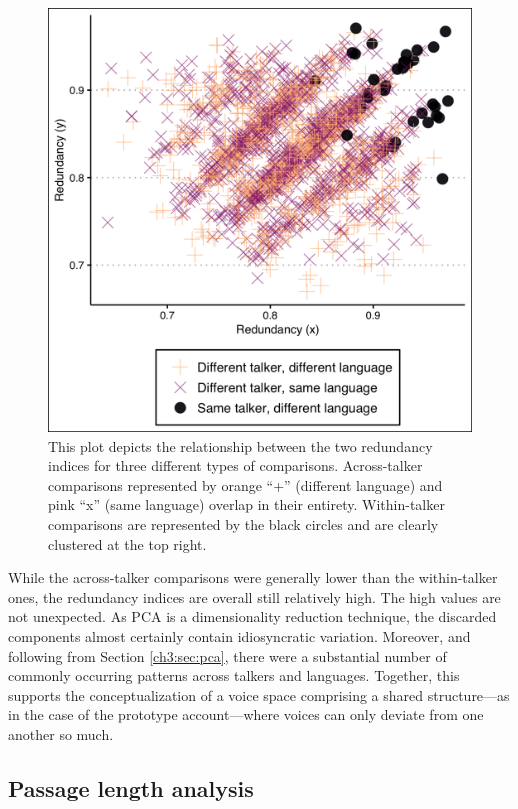 \begin{figure}[ht]
    \begin{center}
    \includegraphics[width=0.9\linewidth]{figures/ch3_redundancy.png} 
    \caption{This plot depicts the relationship between the two redundancy indices for three different types of comparisons. Across-talker comparisons represented by orange ``+'' (different language) and pink ``x'' (same language) overlap in their entirety. Within-talker comparisons are represented by the black circles and are clearly clustered at the top right.}
    \label{ch3:fig:redundancy}
    \end{center}
    \end{figure}

While the across-talker comparisons were generally lower than the within-talker ones, the redundancy indices are overall still relatively high. The high values are not unexpected. As PCA is a dimensionality reduction technique, the discarded components almost certainly contain idiosyncratic variation. Moreover, and following from Section \ref{ch3:sec:pca}, there were a substantial number of commonly occurring patterns across talkers and languages. Together, this supports the conceptualization of a voice space comprising a shared structure---as in the case of the prototype account---where voices can only deviate from one another so much.

\subsection{Passage length analysis}\label{ch3:sec:passagelength}

